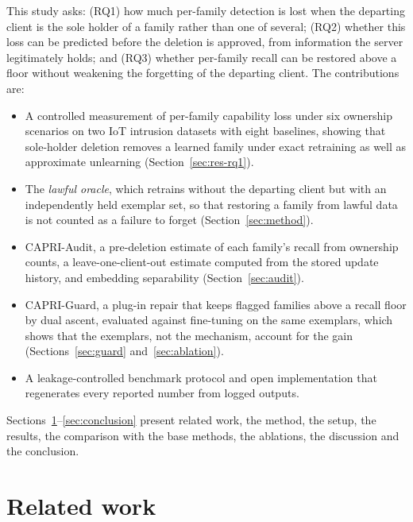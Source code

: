 \documentclass[pdflatex,sn-mathphys-num,iicol]{sn-jnl}
\begin{document}
This study asks: (RQ1) how much per-family detection is lost when the departing client is the sole holder of a family rather than one of several; (RQ2) whether this loss can be predicted before the deletion is approved, from information the server legitimately holds; and (RQ3) whether per-family recall can be restored above a floor without weakening the forgetting of the departing client. The contributions are:
\begin{itemize}
\item A controlled measurement of per-family capability loss under six ownership scenarios on two IoT intrusion datasets with eight baselines, showing that sole-holder deletion removes a learned family under exact retraining as well as approximate unlearning (Section~\ref{sec:res-rq1}).
\item The \emph{lawful oracle}, which retrains without the departing client but with an independently held exemplar set, so that restoring a family from lawful data is not counted as a failure to forget (Section~\ref{sec:method}).
\item CAPRI-Audit, a pre-deletion estimate of each family's recall from ownership counts, a leave-one-client-out estimate computed from the stored update history, and embedding separability (Section~\ref{sec:audit}).
\item CAPRI-Guard, a plug-in repair that keeps flagged families above a recall floor by dual ascent, evaluated against fine-tuning on the same exemplars, which shows that the exemplars, not the mechanism, account for the gain (Sections~\ref{sec:guard} and~\ref{sec:ablation}).
\item A leakage-controlled benchmark protocol and open implementation that regenerates every reported number from logged outputs.
\end{itemize}

Sections~\ref{sec:related}--\ref{sec:conclusion} present related work, the method, the setup, the results, the comparison with the base methods, the ablations, the discussion and the conclusion.

\section{Related work}\label{sec:related}
\end{document}
